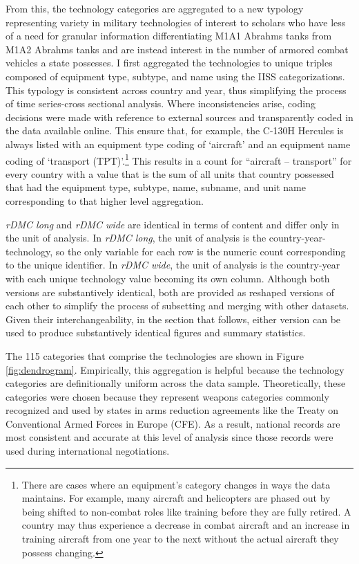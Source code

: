 \documentclass[
]{article}
\begin{document}
From this, the technology categories are aggregated to a new typology representing variety in military technologies of interest to scholars who have less of a need for granular information differentiating M1A1 Abrahms tanks from M1A2 Abrahms tanks and are instead interest in the number of armored combat vehicles a state possesses. I first aggregated the technologies to unique triples composed of equipment type, subtype, and name using the IISS categorizations. This typology is consistent across country and year, thus simplifying the process of time series-cross sectional analysis. Where inconsistencies arise, coding decisions were made with reference to external sources and transparently coded in the data available online. This ensure that, for example, the C-130H Hercules is always listed with an equipment type coding of `aircraft' and an equipment name coding of `transport (TPT)'.\footnote{There are cases where an equipment's category changes in ways the data maintains. For example, many aircraft and helicopters are phased out by being shifted to non-combat roles like training before they are fully retired. A country may thus experience a decrease in combat aircraft and an increase in training aircraft from one year to the next without the actual aircraft they possess changing.} This results in a count for ``aircraft -- transport'' for every country with a value that is the sum of all units that country possessed that had the equipment type, subtype, name, subname, and unit name corresponding to that higher level aggregation.

\textit{rDMC long} and \textit{rDMC wide} are identical in terms of content and differ only in the unit of analysis. In \textit{rDMC long}, the unit of analysis is the country-year-technology, so the only variable for each row is the numeric count corresponding to the unique identifier. In \textit{rDMC wide}, the unit of analysis is the country-year with each unique technology value becoming its own column. Although both versions are substantively identical, both are provided as reshaped versions of each other to simplify the process of subsetting and merging with other datasets. Given their interchangeability, in the section that follows, either version can be used to produce substantively identical figures and summary statistics.

The 115 categories that comprise the technologies are shown in Figure \ref{fig:dendrogram}. Empirically, this aggregation is helpful because the technology categories are definitionally uniform across the data sample. Theoretically, these categories were chosen because they represent weapons categories commonly recognized and used by states in arms reduction agreements like the Treaty on Conventional Armed Forces in Europe (CFE). As a result, national records are most consistent and accurate at this level of analysis since those records were used during international negotiations.
\end{document}

